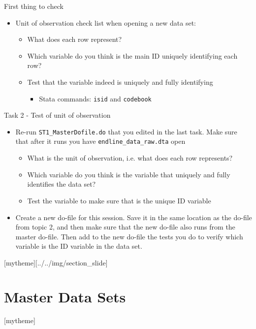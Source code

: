 \documentclass[aspectratio=169]{beamer}
\newcommand{\sectionpic}[2]{
	\setbeamertemplate{section page}[mytheme][#2]
	\section{#1}
	\setbeamertemplate{section page}[mytheme]
}
\begin{document}
\begin{frame}{First thing to check}
	\begin{itemize}
		\item Unit of observation check list when opening a new data set:
		\begin{itemize}
			\item What does each row represent?
			\item Which variable do you think is the main ID uniquely identifying each row?
			\item Test that the variable indeed is uniquely and fully identifying
			\begin{itemize}
				\item Stata commands: \texttt{isid} and \texttt{codebook}
			\end{itemize}
		\end{itemize}
	\end{itemize}
\end{frame}


\begin{frame}{Task 2 - Test of unit of observation}
	\begin{itemize}
		\item Re-run \texttt{ST1\_MasterDofile.do} that you edited in the last task. Make sure that after it runs you have  \texttt{endline\_data\_raw.dta} open
		\begin{itemize}
			\item What is the unit of observation, i.e. what does each row represents?
			\item Which variable do you think is the variable that uniquely and fully identifies the data set?
			\item Test the variable to make sure that is the unique ID variable
		\end{itemize}
		\item Create a new do-file for this session. Save it in the same location as the do-file from topic 2, and then make sure that the new do-file also runs from the master do-file. Then add to the new do-file the tests you do to verify which variable is the ID variable in the data set.
	\end{itemize}
\end{frame}

\sectionpic{Master Data Sets}{../../img/section_slide}
\end{document}
